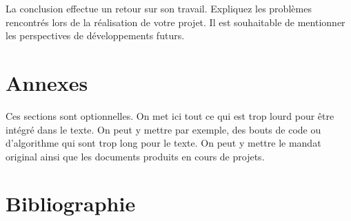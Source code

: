 \documentclass[12pt,fleqn]{article}
\begin{document}
La conclusion effectue un retour sur son travail. Expliquez les problèmes rencontrés lors de la réalisation de votre projet. Il est souhaitable de mentionner les perspectives de développements futurs.

\section{Annexes}

Ces sections sont optionnelles.  On met ici tout ce qui est trop lourd pour être intégré dans le texte.  On peut y mettre par exemple, des bouts de code ou d'algorithme qui sont trop long pour le texte. On peut y mettre le mandat original ainsi que les documents produits en cours de projets.


\section{Bibliographie}
\vspace{-0.75cm}
\renewcommand\refname{}



\nocite{*}
\end{document}
